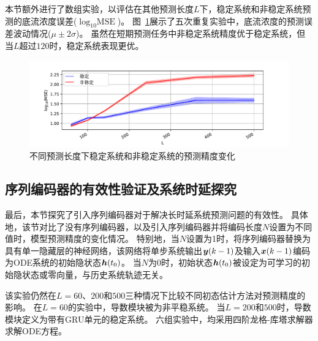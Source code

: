 本节额外进行了数组实验，以评估在其他预测长度$L$下，稳定系统和非稳定系统预测的底流浓度误差($\log_{10}{\text{MSE}}$)。
图~\ref{fig:length_cmp}展示了五次重复实验中，底流浓度的预测误差波动情况($\mu \pm 2\sigma$)。
虽然在短期预测任务中非稳定系统精度优于稳定系统，但当$L$超过$120$时，稳定系统表现更优。
\begin{figure}[h]
    \centering
    \includegraphics[width=\linewidth,trim=50 0 50 10, clip]{figures/chapter3/length_cmp.pdf}
    \caption{
    不同预测长度下稳定系统和非稳定系统的预测精度变化
    }
    \label{fig:length_cmp}
\end{figure}




\subsection{序列编码器的有效性验证及系统时延探究}
\label{sec:3_enc_length}
最后，本节探究了引入序列编码器对于解决长时延系统预测问题的有效性。
具体地，该节对比了没有序列编码器，以及引入序列编码器并将编码长度$N$设置为不同值时，模型预测精度的变化情况。
特别地，当$N$设置为1时，将序列编码器替换为具有单一隐藏层的神经网络，该网络将单步系统输出$\boldsymbol y(k-1)$及输入$\boldsymbol x(k-1)$编码为ODE系统的初始隐状态$\boldsymbol h(t_0)$。
当$N$为0时，初始状态$\boldsymbol h(t_0)$被设定为可学习的初始隐状态\cite{Demeester2020SystemIW}或零向量，与历史系统轨迹无关。

该实验仍然在$L=60$、$200$和$500$三种情况下比较不同初态估计方法对预测精度的影响。
在$L=60$的实验中，导数模块被为非平稳系统。
当$L=200$和$500$时，导数模块定义为带有GRU单元的稳定系统。
六组实验中，均采用四阶龙格-库塔求解器求解ODE方程。



